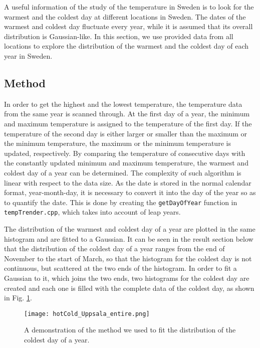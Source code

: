 

A useful information of the study of the temperature in Sweden is to look for the warmest and the coldest day at different locations in Sweden. The dates of the warmest and coldest day fluctuate every year, while it is assumed that its overall distribution is Gaussian-like. In this section, we use provided data from all locations to explore the distribution of the warmest and the coldest day of each year in Sweden. 

\subsection{Method}
In order to get the highest and the lowest temperature, the temperature data from the same year is scanned through. At the first day of a year, the minimum and maximum temperature is assigned to the temperature of the first day. If the temperature of the second day is either larger or smaller than the maximum or the minimum temperature, the maximum or the minimum temperature is updated, respectively. By comparing the temperature of consecutive days with the constantly updated minimum and maximum temperature, the warmest and coldest day of a year can be determined. The complexity of such algorithm is linear with respect to the data size. As the date is stored in the normal calendar format, year-month-day, it is necessary to convert it into the day of the year so as to quantify the date. This is done by creating the \texttt{getDayOfYear} function in \texttt{tempTrender.cpp}, which takes into account of leap years.  

The distribution of the warmest and coldest day of a year are plotted in the same histogram and are fitted to a Gaussian. It can be seen in the result section below that the distribution of the coldest day of a year ranges from the end of November to the start of March, so that the histogram for the coldest day is not continuous, but scattered at the two ends of the histogram. In order to fit a Gaussian to it, which joins the two ends, two histograms for the coldest day are created and each one is filled with the complete data of the coldest day, as shown in Fig. \ref{hotColdUppsalaFit}.
\begin{figure}[H]
\centering
\texttt{[image: hotCold\_Uppsala\_entire.png]}
\caption{A demonstration of the method we used to fit the distribution of the coldest day of a year. }
\label{hotColdUppsalaFit}
\end{figure}

